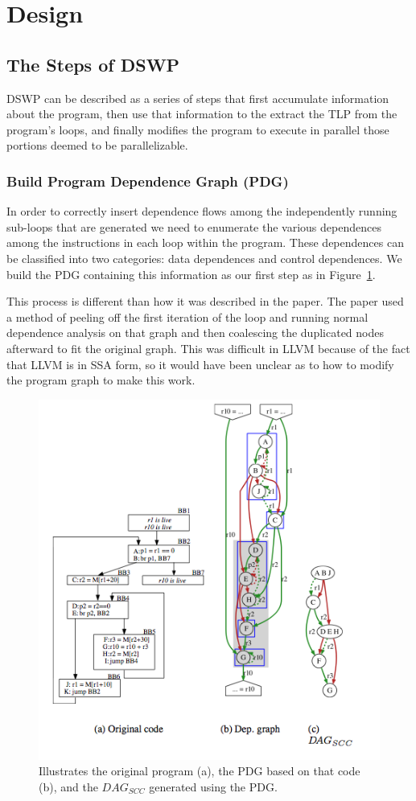 \documentclass[11pt]{article}
\begin{document}
\section{Design}
\subsection{The Steps of DSWP}
DSWP can be described as a series of steps that first accumulate information about the program, then use that information to the extract the TLP from the program's loops, and finally modifies the program to execute in parallel those portions deemed to be parallelizable.

\subsubsection{Build Program Dependence Graph (PDG)}
In order to correctly insert dependence flows among the independently running sub-loops that are generated we need to enumerate the various dependences among the instructions in each loop within the program.  These dependences can be classified into two categories: data dependences and control dependences.  We build the PDG containing this information as our first step as in Figure~\ref{pdg}.

This process is different than how it was described in the paper.  The paper used a method of peeling off the first iteration of the loop and running normal dependence analysis on that graph and then coalescing the duplicated nodes afterward to fit the original graph.  This was difficult in LLVM because of the fact that LLVM is in SSA form, so it would have been unclear as to how to modify the program graph to make this work.

\begin{figure}
\includegraphics[scale=0.75]{pdg}
\caption{Illustrates the original program (a), the PDG based on that code (b), and the $DAG_{SCC}$ generated using the PDG.}
\label{pdg}
\end{figure}
\end{document}
